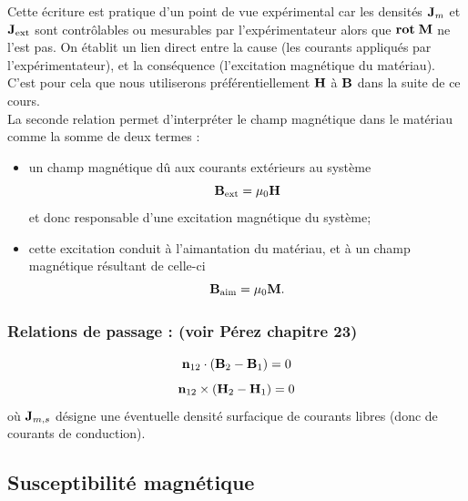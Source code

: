 \documentclass[11pt,a4paper]{report}
\begin{document}
Cette écriture est pratique d'un point de vue expérimental car les densités $\bold{J}_m$ et $\bold{J_\text{ext}}$ sont contrôlables ou mesurables par l'expérimentateur alors que $\textbf{rot}\;\bold{M}$ ne l'est pas. On établit un lien direct entre la cause (les courants appliqués par l'expérimentateur), et la conséquence (l'excitation magnétique du matériau). C'est pour cela que nous utiliserons préférentiellement $\bold{H}$ à $\bold{B}$ dans la suite de ce cours.\\

\newpage
La seconde relation permet d'interpréter le champ magnétique dans le matériau comme la somme de deux termes :
\begin{itemize}
	\item un champ magnétique dû aux courants extérieurs au système 
	\begin{equation}
		\bold{B}_\text{ext} = \mu_0 \bold{H}
	\end{equation}
	et donc responsable d'une excitation magnétique du système;
	\item cette excitation conduit à l'aimantation du matériau, et à un champ magnétique 
	résultant de celle-ci
	\begin{equation}
		\bold{B}_\text{aim} = \mu_0 \bold{M}.
	\end{equation}
\end{itemize}

\subsubsection{Relations de passage : (voir Pérez chapitre 23)}
\begin{equation}
	\bold{n}_{12}\cdot\left(\bold{B}_2 - \bold{B}_1\right) = 0
\end{equation}
\begin{equation}
	\bold{n}_{12}\times\left(\bold{H}_2 - \bold{H}_1\right) = 0
\end{equation}
où $\bold{J}_{m,s}$ désigne une éventuelle densité surfacique de courants libres (donc de courants de conduction).

\subsection{Susceptibilité magnétique}
\end{document}
